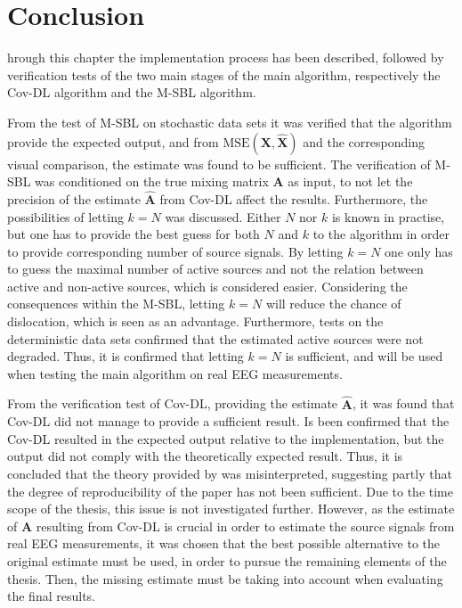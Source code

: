 \section{Conclusion}
hrough this chapter the implementation process has been described, followed by verification tests of the two main stages of the main algorithm, respectively the Cov-DL algorithm and the M-SBL algorithm. 

From the test of M-SBL on stochastic data sets it was verified that the algorithm provide the expected output, and from $\text{MSE}(\mathbf{X}, \hat{\mathbf{X}})$ and the corresponding visual comparison, the estimate was found to be sufficient. 
The verification of M-SBL was conditioned on the true mixing matrix $\mathbf{A}$ as input, to not let the precision of the estimate $\hat{\mathbf{A}}$ from Cov-DL affect the results. 
Furthermore, the possibilities of letting $k = N$ was discussed. Either $N$ nor $k$ is known in practise, but one has to provide the best guess for both $N$ and $k$ to the algorithm in order to provide corresponding number of source signals. 
By letting $k = N$ one only has to guess the maximal number of active sources and not the relation between active and non-active sources, which is considered easier. 
Considering the consequences within the M-SBL, letting $k = N$ will reduce the chance of dislocation, which is seen as an advantage. 
Furthermore, tests on the deterministic data sets confirmed that the estimated active sources were not degraded. 
Thus, it is confirmed that letting $k = N$ is sufficient, and will be used when testing the main algorithm on real EEG measurements. 

From the verification test of Cov-DL, providing the estimate $\hat{\mathbf{A}}$, it was found that Cov-DL did not manage to provide a sufficient result. 
Is been confirmed that the Cov-DL resulted in the expected output relative to the implementation, but the output did not comply with the theoretically expected result. 
Thus, it is concluded that the theory provided by \cite{phd2015} was misinterpreted, suggesting partly that the degree of reproducibility of the paper has not been sufficient. 
Due to the time scope of the thesis, this issue is not investigated further. 
However, as the estimate of $\mathbf{A}$ resulting from Cov-DL is crucial in order to estimate the source signals from real EEG measurements, it was chosen that the best possible alternative to the original estimate must be used, in order to pursue the remaining elements of the thesis. 
Then, the missing estimate must be taking into account when evaluating the final results.

